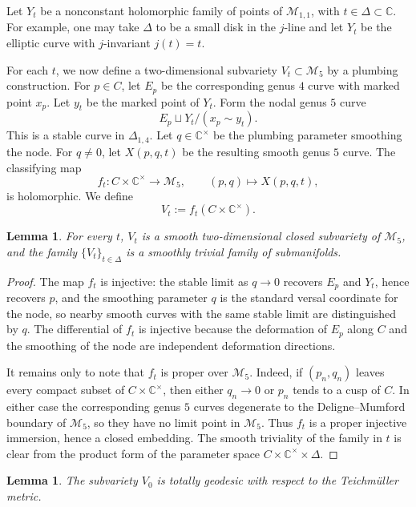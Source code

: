 \documentclass[11pt]{article}
\newtheorem{lemma}[theorem]{Lemma}
\theoremstyle{remark}
\newcommand{\M}{\mathcal M}
\newcommand{\C}{\mathbb C}
\begin{document}
Let \(Y_t\) be a nonconstant holomorphic family of points of \(\M_{1,1}\), with \(t\in \Delta\subset \C\). For example, one may take \(\Delta\) to be a small disk in the \(j\)-line and let \(Y_t\) be the elliptic curve with \(j\)-invariant \(j(t)=t\).

For each \(t\), we now define a two-dimensional subvariety \(V_t\subset \M_5\) by a plumbing construction. For \(p\in C\), let \(E_p\) be the corresponding genus \(4\) curve with marked point \(x_p\). Let \(y_t\) be the marked point of \(Y_t\). Form the nodal genus \(5\) curve
\[
E_p\sqcup Y_t\big/(x_p\sim y_t).
\]
This is a stable curve in \(\Delta_{1,4}\). Let \(q\in \C^{\times}\) be the plumbing parameter smoothing the node. For \(q\neq 0\), let \(X(p,q,t)\) be the resulting smooth genus \(5\) curve. The classifying map
\[
f_t:C\times \C^{\times}\longrightarrow \M_5,\qquad (p,q)\longmapsto X(p,q,t),
\]
is holomorphic. We define
\[
V_t:=f_t(C\times \C^{\times}).
\]

\begin{lemma}
For every \(t\), \(V_t\) is a smooth two-dimensional closed subvariety of \(\M_5\), and the family \(\{V_t\}_{t\in\Delta}\) is a smoothly trivial family of submanifolds.
\end{lemma}

\begin{proof}
The map \(f_t\) is injective: the stable limit as \(q\to 0\) recovers \(E_p\) and \(Y_t\), hence recovers \(p\), and the smoothing parameter \(q\) is the standard versal coordinate for the node, so nearby smooth curves with the same stable limit are distinguished by \(q\). The differential of \(f_t\) is injective because the deformation of \(E_p\) along \(C\) and the smoothing of the node are independent deformation directions.

It remains only to note that \(f_t\) is proper over \(\M_5\). Indeed, if \((p_n,q_n)\) leaves every compact subset of \(C\times \C^{\times}\), then either \(q_n\to 0\) or \(p_n\) tends to a cusp of \(C\). In either case the corresponding genus \(5\) curves degenerate to the Deligne--Mumford boundary of \(\M_5\), so they have no limit point in \(\M_5\). Thus \(f_t\) is a proper injective immersion, hence a closed embedding. The smooth triviality of the family in \(t\) is clear from the product form of the parameter space \(C\times \C^{\times}\times \Delta\).
\end{proof}

\begin{lemma}
The subvariety \(V_0\) is totally geodesic with respect to the Teichm\"uller metric.
\end{lemma}
\end{document}
